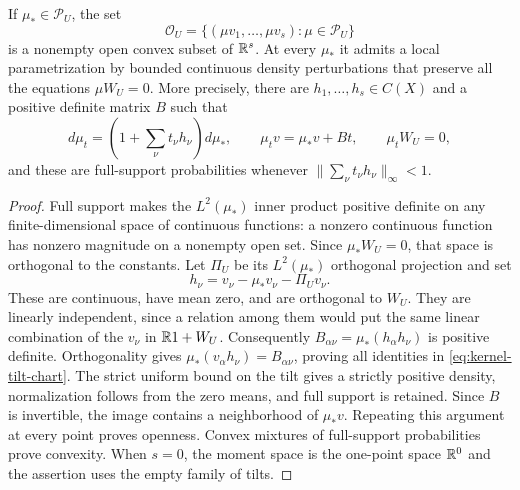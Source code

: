 \begin{lemma}
\label{lem:kernel-moment-chart}
If $\mu_*\in\mathcal P_U$, the set
\[
 \mathcal O_U=\{(\mu v_1,\ldots,\mu v_s):\mu\in\mathcal P_U\}
\]
is a nonempty open convex subset of $\mathbb R^s$. At every $\mu_*$ it admits
a local parametrization by bounded continuous density perturbations
that preserve all the equations $\mu W_U=0$. More precisely, there are
$h_1,\ldots,h_s\in C(X)$ and a positive definite matrix $B$ such that
\begin{equation}\label{eq:kernel-tilt-chart}
 d\mu_t=(1+\textstyle\sum_\nu t_\nu h_\nu)d\mu_*,\qquad
 \mu_t v=\mu_*v+Bt,\qquad \mu_t W_U=0,
\end{equation}
and these are full-support probabilities whenever
$\|\sum_\nu t_\nu h_\nu\|_\infty<1$.
\end{lemma}
\begin{proof}
Full support makes the $L^2(\mu_*)$ inner product positive definite on
any finite-dimensional space of continuous functions: a nonzero
continuous function has nonzero magnitude on a nonempty open set.
Since $\mu_*W_U=0$, that space is orthogonal to the constants. Let
$\Pi_U$ be its $L^2(\mu_*)$ orthogonal projection and set
\[
 h_\nu=v_\nu-\mu_*v_\nu-\Pi_U v_\nu.
\]
These are continuous, have mean zero, and are orthogonal to $W_U$.
They are linearly independent, since a relation among them would put
the same linear combination of the $v_\nu$ in $\mathbb R1+W_U$.
Consequently $B_{\alpha\nu}=\mu_*(h_\alpha h_\nu)$ is positive
definite. Orthogonality gives
$\mu_*(v_\alpha h_\nu)=B_{\alpha\nu}$, proving all identities in
\eqref{eq:kernel-tilt-chart}. The strict uniform bound on the tilt
gives a strictly positive density, normalization follows from the
zero means, and full support is retained. Since $B$ is invertible,
the image contains a neighborhood of $\mu_*v$. Repeating this argument
at every point proves openness. Convex mixtures of full-support
probabilities prove convexity. When $s=0$, the moment space is the
one-point space $\mathbb R^0$ and the assertion uses the empty family of tilts.
\end{proof}

